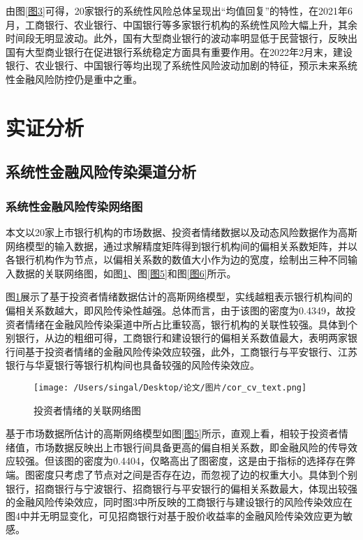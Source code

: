 \documentclass[lang=cn]{elegantpaper}
\begin{document}
由图\ref{图3}可得，20家银行的系统性风险总体呈现出“均值回复”的特性，在2021年6月，工商银行、农业银行、中国银行等多家银行机构的系统性风险大幅上升，其余时间段无明显波动。此外，国有大型商业银行的波动率明显低于民营银行，反映出国有大型商业银行在促进银行系统稳定方面具有重要作用。在2022年2月末，建设银行、农业银行、中国银行等均出现了系统性风险波动加剧的特征，预示未来系统性金融风险防控仍是重中之重。

\section{实证分析}
\subsection{系统性金融风险传染渠道分析}
\subsubsection{系统性金融风险传染网络图}
本文以20家上市银行机构的市场数据、投资者情绪数据以及动态风险数据作为高斯网络模型的输入数据，通过求解精度矩阵得到银行机构间的偏相关系数矩阵，并以各银行机构作为节点，以偏相关系数的数值大小作为边的宽度，绘制出三种不同输入数据的关联网络图，如图\ref{图4}、图\ref{图5}和图\ref{图6}所示。

图\ref{图4}展示了基于投资者情绪数据估计的高斯网络模型，实线越粗表示银行机构间的偏相关系数越大，即风险传染性越强。总体而言，由于该图的密度为0.4349，故投资者情绪在金融风险传染渠道中所占比重较高，银行机构的关联性较强。具体到个别银行，从边的粗细可得，工商银行和建设银行的偏相关系数值最大，表明两家银行间基于投资者情绪的金融风险传染效应较强，此外，工商银行与平安银行、江苏银行与华夏银行等银行机构间也具备较强的风险传染效应。
\begin{figure}[htb]
    \centering
    \texttt{[image: /Users/singal/Desktop/论文/图片/cor\_cv\_text.png]}
    \caption{投资者情绪的关联网络图}
    \label{图4}
\end{figure}

基于市场数据所估计的高斯网络模型如图\ref{图5}所示，直观上看，相较于投资者情绪值，市场数据反映出上市银行间具备更高的偏自相关系数，即金融风险的传导效应较强。但该图的密度为0.4404，仅略高出了图密度，这是由于指标的选择存在弊端。图密度只考虑了节点对之间是否存在边，而忽视了边的权重大小。具体到个别银行，招商银行与宁波银行、招商银行与平安银行的偏相关系数最大，体现出较强的金融风险传染效应，同时图3中所反映的工商银行与建设银行的风险传染效应在图4中并无明显变化，可见招商银行对基于股价收益率的金融风险传染效应更为敏感。
\end{document}
